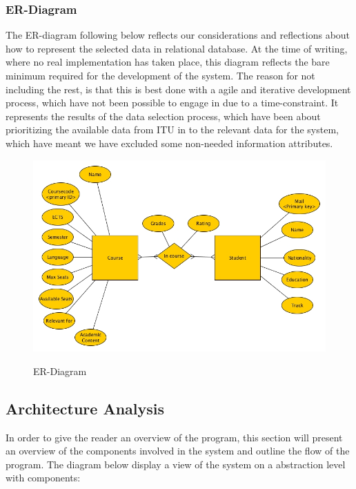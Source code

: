 \subsubsection{ER-Diagram}
The ER-diagram following below reflects our considerations and reflections about how to represent the selected data in relational database. At the time of writing, where no real implementation has taken place, this diagram reflects the bare minimum required for the development of the system. The reason for not including the rest, is that this is best done with a agile and iterative development process, which have not been possible to engage in due to a time-constraint. It represents the results of the data selection process, which have been about prioritizing the available data from ITU in to the relevant data for the system, which have meant we have excluded some non-needed information attributes.

\begin{figure}[H]
\centering
\includegraphics[scale=0.5]{Pictures/ER-Diagram.jpg}
\label{ER-diagram}
\caption{ER-Diagram}
\end{figure}

\subsection{Architecture Analysis}
In order to give the reader an overview of the program, this section will present an overview of the components involved in the system and outline the flow of the program. The diagram below display a view of the system on a abstraction level with components: 

